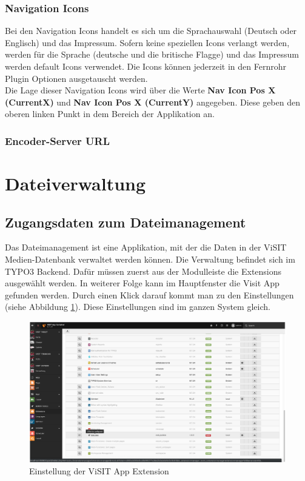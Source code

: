 \subsubsection{Navigation Icons}

Bei den Navigation Icons handelt es sich um die Sprachauswahl (Deutsch oder Englisch) und das Impressum. Sofern keine speziellen Icons verlangt werden, werden für die Sprache (deutsche und die britische Flagge) und das Impressum werden default Icons verwendet. Die Icons können jederzeit in den Fernrohr Plugin Optionen ausgetauscht werden.\\

Die Lage dieser Navigation Icons wird über die Werte \textbf{Nav Icon Pos X (CurrentX)} und \textbf{Nav Icon Pos X (CurrentY)} angegeben. Diese geben den oberen linken Punkt in dem Bereich der Applikation an.

\subsubsection{Encoder-Server URL}



\cleardoublepage

\section{Dateiverwaltung}

\subsection{Zugangsdaten zum Dateimanagement}

Das Dateimanagement ist eine Applikation, mit der die Daten in der ViSIT Medien-Datenbank verwaltet werden können. Die Verwaltung befindet sich im TYPO3 Backend. Dafür müssen zuerst aus der Modulleiste die Extensions ausgewählt werden. In weiterer Folge kann im Hauptfenster die Visit App gefunden werden. Durch einen Klick darauf kommt man zu den Einstellungen (siehe Abbildung \ref{img:einstellung_extension}). Diese Einstellungen sind im ganzen System gleich.

\begin{figure}[ht!]
\centering
\includegraphics[width=12cm]{Figures/paula/dateiverwaltung/einstellung_extension.png}
\caption{Einstellung der ViSIT App Extension}
\label{img:einstellung_extension}
\end{figure}

